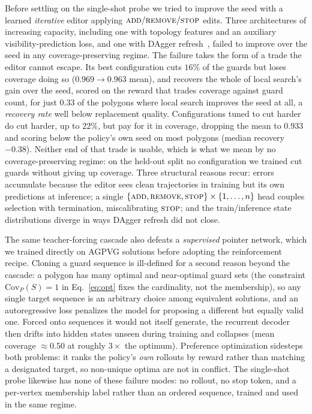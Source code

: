 \documentclass[11pt]{article}
\newcommand{\Covf}[1]{\mathrm{Cov}_P(#1)}
\begin{document}
Before settling on the single-shot probe we tried to improve the seed with a learned \emph{iterative} editor applying $\textsc{add}/\textsc{remove}/\textsc{stop}$ edits. Three architectures of increasing capacity, including one with topology features and an auxiliary visibility-prediction loss, and one with DAgger refresh~\cite{RossGordonBagnell2011DAgger}, failed to improve over the seed in any coverage-preserving regime. The failure takes the form of a trade the editor cannot escape. Its best configuration cuts $16\%$ of the guards but loses coverage doing so ($0.969 \to 0.963$ mean), and recovers the whole of local search's gain over the seed, scored on the reward that trades coverage against guard count, for just $0.33$ of the polygons where local search improves the seed at all, a \emph{recovery rate} well below replacement quality. Configurations tuned to cut harder do cut harder, up to $22\%$, but pay for it in coverage, dropping the mean to $0.933$ and scoring below the policy's own seed on most polygons (median recovery $-0.38$). Neither end of that trade is usable, which is what we mean by no coverage-preserving regime: on the held-out split no configuration we trained cut guards without giving up coverage. Three structural reasons recur: errors accumulate because the editor sees clean trajectories in training but its own predictions at inference; a single $\{\textsc{add},\textsc{remove},\textsc{stop}\}\times\{1,\dots,n\}$ head couples selection with termination, miscalibrating $\textsc{stop}$; and the train/inference state distributions diverge in ways DAgger refresh did not close.

The same teacher-forcing cascade also defeats a \emph{supervised} pointer network, which we trained directly on AGPVG solutions before adopting the reinforcement recipe. Cloning a guard sequence is ill-defined for a second reason beyond the cascade: a polygon has many optimal and near-optimal guard sets (the constraint $\Covf{S}=1$ in Eq.~\eqref{eq:opt} fixes the cardinality, not the membership), so any single target sequence is an arbitrary choice among equivalent solutions, and an autoregressive loss penalizes the model for proposing a different but equally valid one. Forced onto sequences it would not itself generate, the recurrent decoder then drifts into hidden states unseen during training and collapses (mean coverage $\approx 0.50$ at roughly $3\times$ the optimum). Preference optimization sidesteps both problems: it ranks the policy's \emph{own} rollouts by reward rather than matching a designated target, so non-unique optima are not in conflict. The single-shot probe likewise has none of these failure modes: no rollout, no stop token, and a per-vertex membership label rather than an ordered sequence, trained and used in the same regime.
\end{document}
